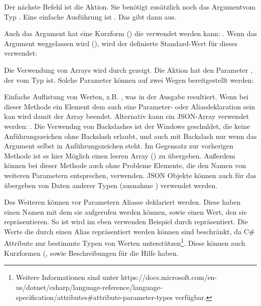 Der nächste Befehl ist die  Aktion.
Sie benötigt zusätzlich noch das  Argumentvom Typ .
Eine einfache Ausführung ist .
Das gibt dann  aus.

Auch das Argument hat eine Kurzform () die verwendet werden kann: .
Wenn das Argument weggelassen wird (), wird der definierte Standard-Wert für dieses verwendet:

Die Verwendung von Arrays wird durch  gezeigt.
Die Aktion hat den Parameter , der vom Typ  ist.
Solche Parameter können auf zwei Wegen bereitgestellt werden:
\begin{outline}
 \1 Einfache Auflistung von Werten, z.B. , was in der Ausgabe  resultiert.
 Wenn bei dieser Methode ein Element dem auch eine Parameter- oder Aliasdeklaration sein kan wird damit der Array beendet.
 \1 Alternativ kann ein JSON-Array verwendet werden: .
 Die Verwendng von Backslashes ist der Windows  geschuldet, die keine Anführungszeichen ohne Backslash erlaubt,
 und auch mit Backslash nur wenn das Argument selbst in Anführungszeichen steht.
 Im Gegensatz zur vorherigen Methode ist es hier Möglich einen leeren Array (\inlinecode{[]}) zu übergeben.
 Au\ss erdem können bei dieser Methode auch ohne Probleme Elemente, die den Namen von weiteren Parametern entsprechen, verwenden.
 JSON Objekte können auch für das übergeben von Daten anderer Typen (ausnahme ) verwendet werden.
\end{outline} 

Des Weiteren können vor Parametern Aliasse deklariert werden.
Diese haben einen Namen mit dem sie aufgerufen werden können, sowie einen Wert, den sie repräsentieren.
So ist wird im eben verwenden Beispiel  durch  repräsentiert.
Die Werte die durch einen Alias repräsentiert werden können sind beschränkt, da C\# Attribute nur bestimmte Typen von Werten unterstützen\footnote{Weitere Informationen sind unter https://docs.microsoft.com/en-us/dotnet/csharp/language-reference/language-specification/attributes\#attribute-parameter-types verfügbar.}.
Diese können auch Kurzformen (, sowie Beschreibungen für die Hilfe haben.

